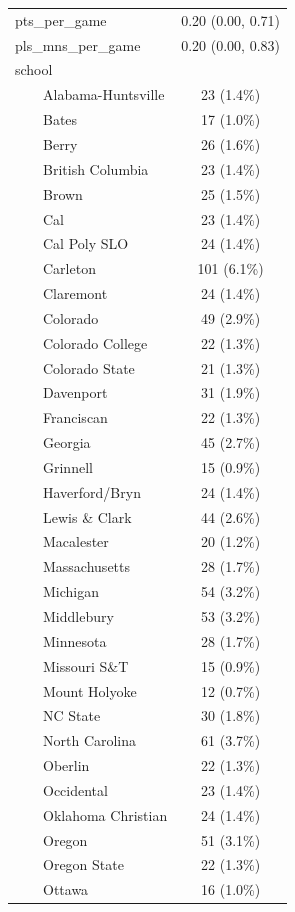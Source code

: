 \documentclass[
  letterpaper,
  DIV=11,
  numbers=noendperiod]{scrartcl}
\begin{document}
\begin{table}
\begin{tabular*}{\linewidth}{@{\extracolsep{\fill}}lc}
pts\_per\_game & 0.20 (0.00, 0.71) \\ 
pls\_mns\_per\_game & 0.20 (0.00, 0.83) \\ 
school &  \\ 
    Alabama-Huntsville & 23 (1.4\%) \\ 
    Bates & 17 (1.0\%) \\ 
    Berry & 26 (1.6\%) \\ 
    British Columbia & 23 (1.4\%) \\ 
    Brown & 25 (1.5\%) \\ 
    Cal & 23 (1.4\%) \\ 
    Cal Poly SLO & 24 (1.4\%) \\ 
    Carleton & 101 (6.1\%) \\ 
    Claremont & 24 (1.4\%) \\ 
    Colorado & 49 (2.9\%) \\ 
    Colorado College & 22 (1.3\%) \\ 
    Colorado State & 21 (1.3\%) \\ 
    Davenport & 31 (1.9\%) \\ 
    Franciscan & 22 (1.3\%) \\ 
    Georgia & 45 (2.7\%) \\ 
    Grinnell & 15 (0.9\%) \\ 
    Haverford/Bryn & 24 (1.4\%) \\ 
    Lewis \& Clark & 44 (2.6\%) \\ 
    Macalester & 20 (1.2\%) \\ 
    Massachusetts & 28 (1.7\%) \\ 
    Michigan & 54 (3.2\%) \\ 
    Middlebury & 53 (3.2\%) \\ 
    Minnesota & 28 (1.7\%) \\ 
    Missouri S\&T & 15 (0.9\%) \\ 
    Mount Holyoke & 12 (0.7\%) \\ 
    NC State & 30 (1.8\%) \\ 
    North Carolina & 61 (3.7\%) \\ 
    Oberlin & 22 (1.3\%) \\ 
    Occidental & 23 (1.4\%) \\ 
    Oklahoma Christian & 24 (1.4\%) \\ 
    Oregon & 51 (3.1\%) \\ 
    Oregon State & 22 (1.3\%) \\ 
    Ottawa & 16 (1.0\%) \\ 

\end{tabular*}
\end{table}
\end{document}
